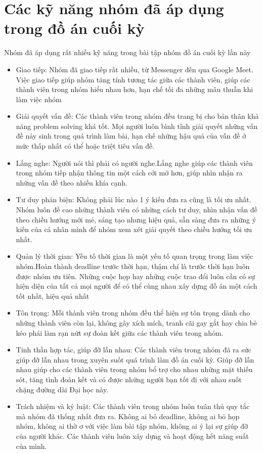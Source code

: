 \documentclass[13pt,a4paper]{article}
\begin{document}
\section{Các kỹ năng nhóm đã áp dụng trong đồ án cuối kỳ}
Nhóm đã áp dụng rất nhiều kỹ năng trong bài tập nhóm đồ án cuối kỳ lần này
\begin{itemize}
    \item Giao tiếp: Nhóm đã giao tiếp rất nhiều, từ Messenger đến qua Google Meet. Việc giao tiếp giúp nhóm tăng tính tương tác giữa các thành viên, giúp các thành viên trong nhóm hiểu nhau hơn, hạn chế tối đa những mâu thuẫn khi làm việc nhóm
    \item Giải quyết vấn đề: Các thành viên trong nhóm đều trang bị cho bản thân khả năng problem solving khá tốt. Mọi người luôn bình tĩnh giải quyết những vấn đề nảy sinh trong quá trình làm bài, hạn chế những hậu quả của vấn đề ở mức thấp nhất có thể hoặc triệt tiêu vấn đề. 
    \item Lắng nghe: Người nói thì phải có người nghe.Lắng nghe giúp các thành viên trong nhóm tiếp nhận thông tin một cách cởi mở hơn, giúp nhìn nhận ra những vấn đề theo nhiều khía cạnh.
    \item Tư duy phản biện: Không phải lúc nào 1 ý kiến đưa ra cũng là tối ưu nhất. Nhóm luôn đề cao những thành viên có những cách tư duy, nhìn nhận vấn đề theo chiều hướng mới mẻ, sáng tạo nhưng hiệu quả, sẵn sàng đưa ra những ý kiến của cá nhân mình để nhóm xem xét giải quyết theo chiều hướng tối ưu nhất.
    \item Quản lý thời gian: Yếu tố thời gian là một yếu tố quan trọng trong làm việc nhóm.Hoàn thành deadline trước thời hạn, thậm chí là trước thời hạn luôn được nhóm ưu tiên. Những cuộc họp hay những cuộc trao đổi luôn cần có sự hiện diện của tất cả mọi người để có thể cùng nhau xây dựng đồ án một cách tốt nhất, hiệu quả nhất
    \item Tôn trọng: Mỗi thành viên trong nhóm đều thể hiện sự tôn trọng dành cho những thành viên còn lại, không gây xích mích, tranh cãi gay gắt hay chia bè kéo phái làm rạn nứt sự đoàn kết giữa các thành viên trong nhóm.
    \item Tinh thần hợp tác, giúp đỡ lẫn nhau: Các thành viên trong nhóm đã ra sức giúp đỡ lẫn nhau trong xuyên suốt quá trình làm đồ án cuối kỳ. Giúp đỡ lẫn nhau giúp cho các thành viên trong nhóm bổ trợ cho nhau những mặt thiếu sót, tăng tình đoàn kết và có được những người bạn tốt đi với nhau suốt chặng đường dài Đại học này.
    \item Trách nhiệm và kỷ luật: Các thành viên trong nhóm luôn tuân thủ quy tắc mà nhóm đã thống nhất đưa ra. Không ai bỏ deadline, không ai bỏ họp nhóm, không ai thờ ơ với việc làm bài tập nhóm, không ai ỷ lại sự giúp đỡ của người khác. Các thành viên luôn xây dựng và hoạt động hết năng suất của mình.
\end{itemize}
\end{document}
